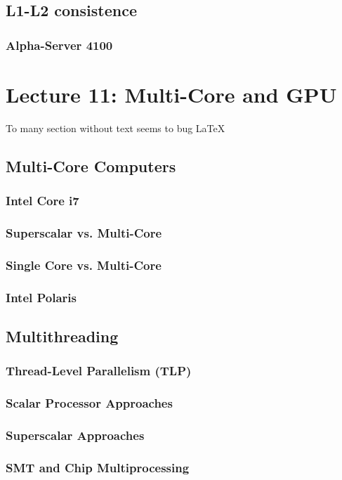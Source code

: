 \documentclass[titlepage, a4paper]{article}
\begin{document}
\subsection{L1-L2 consistence}
\subsubsection{Alpha-Server 4100}

\section{Lecture 11: Multi-Core and GPU}
To many section without text seems to bug \LaTeX
\subsection{Multi-Core Computers}
\subsubsection{Intel Core i7}
\subsubsection{Superscalar vs. Multi-Core}
\subsubsection{Single Core vs. Multi-Core}
\subsubsection{Intel Polaris}
\subsection{Multithreading}
\subsubsection{Thread-Level Parallelism (TLP)}
\subsubsection{Scalar Processor Approaches}
\subsubsection{Superscalar Approaches}
\subsubsection{SMT and Chip Multiprocessing}
\end{document}
